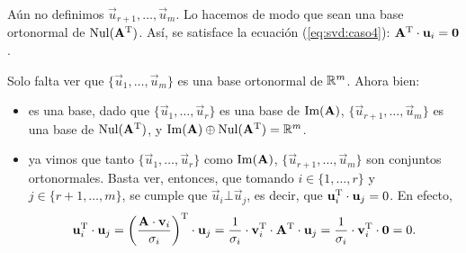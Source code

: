 \begin{enumerate}[label=(\roman*)]
    Aún no definimos $\vec{u}_{r+1}, \dots, \vec{u}_m$.
    Lo hacemos de modo que sean una base ortonormal de $\operatorname{Nul}(\mathbf{A}^{\mathrm{T}})$.
    Así, se satisface la ecuación
    (\ref{eq:svd:caso4}): $\mathbf{A}^{\mathrm{T}} \cdot \mathbf{u}_i = \mathbf{0}$.

    Solo falta ver que $\lbrace \vec{u}_1, \dots, \vec{u}_m \rbrace$ es una
    base ortonormal de $\mathbb{R}^m$. Ahora bien:
    \begin{itemize}
    \item es una base, dado que $\lbrace \vec{u}_1, \dots, \vec{u}_r \rbrace$
        es una base de $\operatorname{Im}(\mathbf{A})$,
        $\lbrace \vec{u}_{r+1},\dots,\vec{u}_m \rbrace$ es una base de
        $\operatorname{Nul}(\mathbf{A}^{\mathrm{T}})$, y $\operatorname{Im}(\mathbf{A}) \oplus \operatorname{Nul}(\mathbf{A}^{\mathrm{T}}) =
        \mathbb{R}^m$.
    \item ya vimos que tanto $\lbrace \vec{u}_1, \dots, \vec{u}_r \rbrace$
        como $\operatorname{Im}(\mathbf{A})$, $\lbrace \vec{u}_{r+1},\dots,\vec{u}_m \rbrace$
        son conjuntos ortonormales. Basta ver, entonces, que tomando
        $i \in \{1,\dots,r\}$ y $j \in \{r+1,\dots,m\}$,
        se cumple que $\vec{u}_i \bot \vec{u}_j$, es decir, que
        $\mathbf{u}_i^{\mathrm{T}} \cdot \mathbf{u}_j = 0$. En efecto,
        \[ \mathbf{u}_i^{\mathrm{T}} \cdot \mathbf{u}_j
            = \left( \frac{\mathbf{A} \cdot \mathbf{v}_i}{\sigma_i} \right)^{\mathrm{T}}
                \cdot \mathbf{u}_j
            = \frac{1}{\sigma_i} \cdot \mathbf{v}_i^{\mathrm{T}} \cdot \mathbf{A}^{\mathrm{T}}
                \cdot \mathbf{u}_j
            = \frac{1}{\sigma_i} \cdot \mathbf{v}_i^{\mathrm{T}} \cdot \mathbf{0}
            = 0. \]
    \end{itemize}
\end{enumerate}


